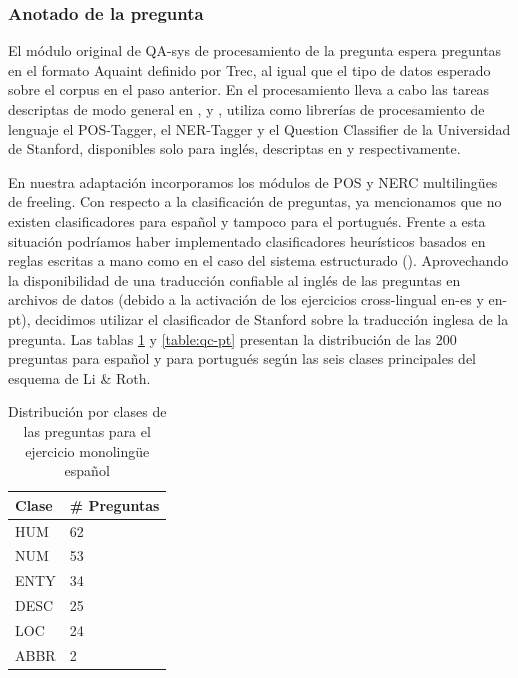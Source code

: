 \subsubsection{Anotado de la pregunta}

El módulo original de QA-sys de procesamiento de la pregunta espera preguntas en el formato Aquaint definido por Trec, al igual que el tipo de datos esperado sobre el corpus en el paso anterior. En el procesamiento lleva a cabo las tareas descriptas de modo general en ,  y ,  utiliza como librerías de procesamiento de lenguaje el POS-Tagger, el NER-Tagger y el Question Classifier de la Universidad de Stanford, disponibles solo para inglés, descriptas en  y  respectivamente.

En nuestra adaptación incorporamos los módulos de POS y NERC multilingües de freeling. Con respecto a la clasificación de preguntas, ya mencionamos que no existen clasificadores para español y tampoco para el portugués. Frente a esta situación podríamos haber implementado clasificadores heurísticos basados en reglas escritas a mano como en el caso del sistema estructurado (). Aprovechando la disponibilidad de una traducción confiable al inglés de las preguntas en archivos de datos (debido a la activación de los ejercicios cross-lingual en-es y en-pt), decidimos utilizar el clasificador de Stanford sobre la traducción inglesa de la pregunta.
Las tablas \ref{table:qc-es} y \ref{table:qc-pt} presentan la distribución de las 200 preguntas para español y para portugués según las seis clases principales del esquema de Li \& Roth. 

\begin{table}
\centering
\begin{center}
\begin{tabular}{| l | l | }
\hline
Clase & \# Preguntas  \\ \hline
HUM &  62\\ \hline
NUM &  53\\ \hline        
ENTY &  34\\ \hline
DESC &  25\\ \hline
LOC &  24\\ \hline    
ABBR &  2\\ \hline
\end{tabular}
\caption{Distribución por clases de las preguntas para el ejercicio monolingüe español}
\label{table:qc-es}
\end{center}
\end{table}



